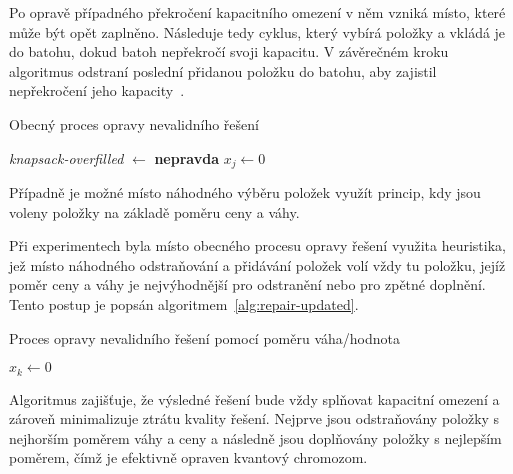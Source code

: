 Po opravě případného překročení kapacitního omezení v něm vzniká místo, které může být opět zaplněno. 
Následuje tedy cyklus, který vybírá položky a vkládá je do batohu, dokud batoh nepřekročí svoji kapacitu. 
V závěrečném kroku algoritmus odstraní poslední přidanou položku do batohu, aby zajistil nepřekročení jeho kapacity~\cite{qiga}.
\begin{algorithm}[ht!]
    \caption{Obecný proces opravy nevalidního řešení}
    \label{alg:repair}
    \textit{knapsack-overfilled} $\gets$ \textbf{nepravda}\;
    $x_j \gets 0$\;
\end{algorithm}

Případně je možné místo náhodného výběru položek využít princip, kdy jsou voleny položky na základě poměru ceny a váhy. 

Při experimentech byla místo obecného procesu opravy řešení využita heuristika, jež místo náhodného odstraňování a přidávání položek volí vždy tu položku, jejíž poměr ceny a váhy je nejvýhodnější pro odstranění nebo pro zpětné doplnění. 
Tento postup je popsán algoritmem~\ref{alg:repair-updated}.
\begin{algorithm}[ht]
    \caption{Proces opravy nevalidního řešení pomocí poměru váha/hodnota}
    \label{alg:repair-updated}
    $x_k \gets 0$\;
    \;
\end{algorithm}
Algoritmus zajišťuje, že výsledné řešení bude vždy splňovat kapacitní omezení a zároveň minimalizuje ztrátu kvality řešení. 
Nejprve jsou odstraňovány položky s nejhorším poměrem váhy a ceny a následně jsou doplňovány položky s nejlepším poměrem, čímž je efektivně opraven kvantový chromozom. 

